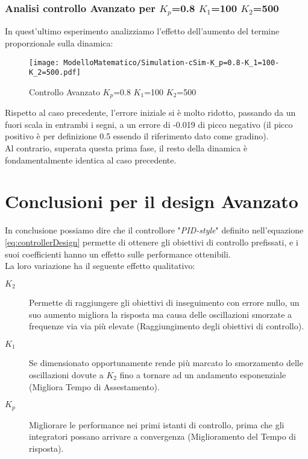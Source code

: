 \subsubsection{Analisi controllo Avanzato per $ K_p $=0.8 $ K_1 $=100 $ K_2 $=500}
In quest'ultimo esperimento analizziamo l'effetto dell'aumento del termine proporzionale sulla dinamica:
\begin{figure}[H]
	\centering
	\caption[Controllo Avanzato $ K_p $=0.8 $ K_1 $=100 $ K_2 $=500]{Controllo Avanzato $ K_p $=0.8 $ K_1 $=100 $ K_2 $=500}
	\texttt{[image: ModelloMatematico/Simulation-cSim-K\_p=0.8-K\_1=100-K\_2=500.pdf]}
\end{figure}
\noindent
Rispetto al caso precedente, l'errore iniziale si è molto ridotto, passando da un fuori scala in entrambi i segni, a un errore di -0.019 di picco negativo (il picco positivo è per definizione 0.5 essendo il riferimento dato come gradino).\\
Al contrario, superata questa prima fase, il resto della dinamica è fondamentalmente identica al caso precedente.

\newpage

\section{Conclusioni per il design Avanzato} \label{sec:designControlloreConclusioni}
In conclusione possiamo dire che il controllore "\textit{PID-style}" definito nell'equazione \ref{eq:controllerDesign} permette di ottenere gli obiettivi di controllo prefissati, e i suoi coefficienti hanno un effetto sulle performance ottenibili.\\
La loro variazione ha il seguente effetto qualitativo:
\begin{description}
	\item[{\boldmath$ K_2 $}] Permette di raggiungere gli obiettivi di inseguimento con errore nullo, un suo aumento migliora la risposta ma causa delle oscillazioni smorzate a frequenze via via più elevate (Raggiungimento degli obiettivi di controllo).
	\item[{\boldmath$ K_1 $}] Se dimensionato opportunamente rende più marcato lo smorzamento delle oscillazioni dovute a $ K_2 $ fino a tornare ad un andamento esponenziale (Migliora Tempo di Assestamento).
	\item[{\boldmath$ K_p $}] Migliorare le performance nei primi istanti di controllo, prima che gli integratori possano arrivare a convergenza (Miglioramento del Tempo di risposta).
\end{description}

